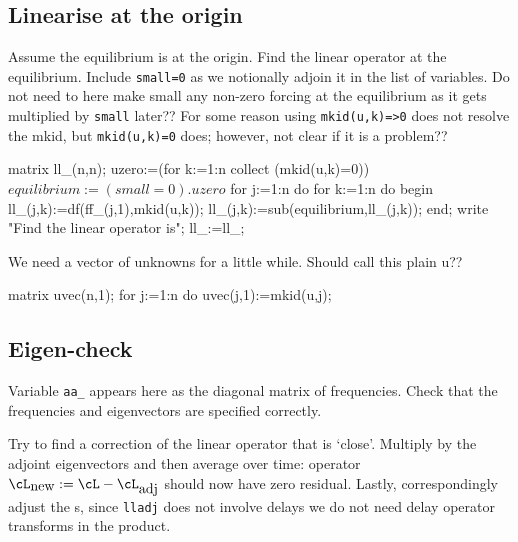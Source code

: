 \documentclass[11pt,a5paper]{article}
\begin{document}
\subsection{Linearise at the origin}
Assume the equilibrium is at the origin.
Find the linear operator at the equilibrium.
Include \verb|small=0| as we notionally adjoin it in the list of variables.
Do not need to here make small any non-zero forcing at the equilibrium as it gets multiplied by \verb|small| later??
For some reason using \verb|mkid(u,k)=>0| does not resolve the mkid, but \verb|mkid(u,k)=0| does; however, not clear if it is a problem??

\begin{reduce}
matrix ll_(n,n);
uzero:=(for k:=1:n collect (mkid(u,k)=0))$
equilibrium:=(small=0).uzero$
for j:=1:n do for k:=1:n do begin 
  ll_(j,k):=df(ff_(j,1),mkid(u,k));
  ll_(j,k):=sub(equilibrium,ll_(j,k));
end;
write "Find the linear operator is";
ll_:=ll_;
\end{reduce}

We need a vector of unknowns for a little while.
Should call this plain u??

\begin{reduce}
matrix uvec(n,1);
for j:=1:n do uvec(j,1):=mkid(u,j);
\end{reduce}


\subsection{Eigen-check}

Variable \verb|aa_| appears here as the diagonal matrix of frequencies.
Check that the frequencies and eigenvectors are specified correctly.


Try to find a correction of the linear operator that is `close'.
Multiply by the adjoint eigenvectors and then average over time: operator \(\cL_{\text{new}}:=\cL-\cL_{\text{adj}}\) should now have zero residual.
Lastly, correspondingly adjust the \ode{}s, since \verb|lladj| does not involve delays we do not need delay operator transforms in the product.
\end{document}
